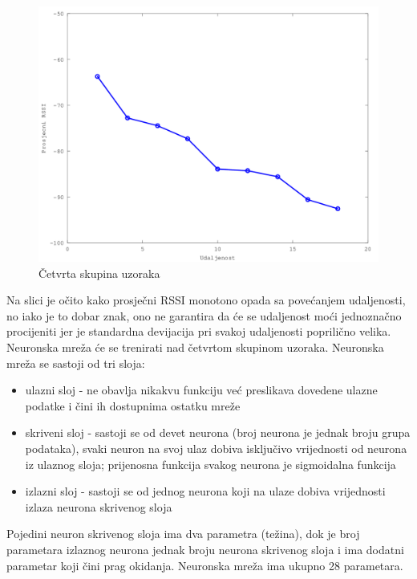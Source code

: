 \begin{figure}[H]
    \centering
    \includegraphics[scale=0.62]{pictures/cetvrta-skupina-uzoraka}
    \caption{Četvrta skupina uzoraka}
    \label{fig:velikaUdaljenost}
\end{figure}

Na slici je očito kako prosječni RSSI monotono opada sa povećanjem udaljenosti, no iako je to dobar znak, ono ne garantira da će se udaljenost moći jednoznačno procijeniti jer je standardna devijacija pri svakoj udaljenosti poprilično velika.
\\

Neuronska mreža će se trenirati nad četvrtom skupinom uzoraka. 
Neuronska mreža se sastoji od tri sloja:
\begin{itemize}
 \item ulazni sloj - ne obavlja nikakvu funkciju već preslikava dovedene ulazne podatke i čini ih dostupnima ostatku mreže
 \item skriveni sloj - sastoji se od devet neurona (broj neurona je jednak broju grupa podataka), svaki neuron na svoj ulaz dobiva isključivo vrijednosti od neurona iz ulaznog sloja; prijenosna funkcija svakog neurona je sigmoidalna funkcija
 \item izlazni sloj - sastoji se od jednog neurona koji na ulaze dobiva vrijednosti izlaza neurona skrivenog sloja
\end{itemize}
Pojedini neuron skrivenog sloja ima dva parametra (težina), dok je broj parametara izlaznog neurona jednak broju neurona skrivenog sloja i ima dodatni parametar koji čini prag okidanja. 
Neuronska mreža ima ukupno 28 parametara.
\\

